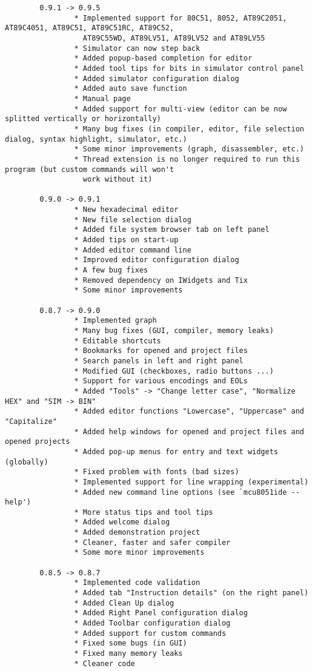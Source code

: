 \documentclass[a4paper,twoside,12pt]{book}
\begin{document}
{\begin{verbatim}
		0.9.1 -> 0.9.5
		        * Implemented support for 80C51, 8052, AT89C2051, AT89C4051, AT89C51, AT89C51RC, AT89C52,
		          AT89C55WD, AT89LV51, AT89LV52 and AT89LV55
		        * Simulator can now step back
		        * Added popup-based completion for editor
		        * Added tool tips for bits in simulator control panel
		        * Added simulator configuration dialog
		        * Added auto save function
		        * Manual page
		        * Added support for multi-view (editor can be now splitted vertically or horizontally)
		        * Many bug fixes (in compiler, editor, file selection dialog, syntax highlight, simulator, etc.)
		        * Some minor improvements (graph, disassembler, etc.)
		        * Thread extension is no longer required to run this program (but custom commands will won't
		          work without it)

		0.9.0 -> 0.9.1
		        * New hexadecimal editor
		        * New file selection dialog
		        * Added file system browser tab on left panel
		        * Added tips on start-up
		        * Added editor command line
		        * Improved editor configuration dialog
		        * A few bug fixes
		        * Removed dependency on IWidgets and Tix
		        * Some minor improvements

		0.8.7 -> 0.9.0
		        * Implemented graph
		        * Many bug fixes (GUI, compiler, memory leaks)
		        * Editable shortcuts
		        * Bookmarks for opened and project files
		        * Search panels in left and right panel
		        * Modified GUI (checkboxes, radio buttons ...)
		        * Support for various encodings and EOLs
		        * Added "Tools" -> "Change letter case", "Normalize HEX" and "SIM -> BIN"
		        * Added editor functions "Lowercase", "Uppercase" and "Capitalize"
		        * Added help windows for opened and project files and opened projects
		        * Added pop-up menus for entry and text widgets (globally)
		        * Fixed problem with fonts (bad sizes)
		        * Implemented support for line wrapping (experimental)
		        * Added new command line options (see `mcu8051ide --help')
		        * More status tips and tool tips
		        * Added welcome dialog
		        * Added demonstration project
		        * Cleaner, faster and safer compiler
		        * Some more minor improvements

		0.8.5 -> 0.8.7
		        * Implemented code validation
		        * Added tab "Instruction details" (on the right panel)
		        * Added Clean Up dialog
		        * Added Right Panel configuration dialog
		        * Added Toolbar configuration dialog
		        * Added support for custom commands
		        * Fixed some bugs (in GUI)
		        * Fixed many memory leaks
		        * Cleaner code


\end{verbatim}}
\end{document}

